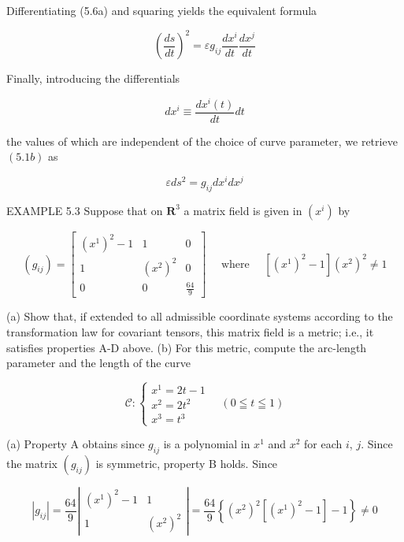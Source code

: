 \documentclass[10pt]{article}
\begin{document}
Differentiating (5.6a) and squaring yields the equivalent formula


\begin{equation*}
\left(\frac{d s}{d t}\right)^{2}=\varepsilon g_{i j} \frac{d x^{i}}{d t} \frac{d x^{j}}{d t} \tag{5.6b}
\end{equation*}


Finally, introducing the differentials

$$
d x^{i} \equiv \frac{d x^{i}(t)}{d t} d t
$$

the values of which are independent of the choice of curve parameter, we retrieve $(5.1 b)$ as


\begin{equation*}
\varepsilon d s^{2}=g_{i j} d x^{i} d x^{j} \tag{5.6c}
\end{equation*}


EXAMPLE 5.3 Suppose that on $\mathbf{R}^{3}$ a matrix field is given in $\left(x^{i}\right)$ by

$$
\left(g_{i j}\right)=\left[\begin{array}{ccc}
\left(x^{1}\right)^{2}-1 & 1 & 0 \\
1 & \left(x^{2}\right)^{2} & 0 \\
0 & 0 & \frac{64}{9}
\end{array}\right] \quad \text { where } \quad\left[\left(x^{1}\right)^{2}-1\right]\left(x^{2}\right)^{2} \neq 1
$$

(a) Show that, if extended to all admissible coordinate systems according to the transformation law for covariant tensors, this matrix field is a metric; i.e., it satisfies properties A-D above. (b) For this metric, compute the arc-length parameter and the length of the curve

$$
\mathscr{C}:\left\{\begin{array}{l}
x^{1}=2 t-1 \\
x^{2}=2 t^{2} \\
x^{3}=t^{3}
\end{array} \quad(0 \leqq t \leqq 1)\right.
$$

(a) Property A obtains since $g_{i j}$ is a polynomial in $x^{1}$ and $x^{2}$ for each $i$, $j$. Since the matrix $\left(g_{i j}\right)$ is symmetric, property B holds. Since

$$
\left|g_{i j}\right|=\frac{64}{9}\left|\begin{array}{cc}
\left(x^{1}\right)^{2}-1 & 1 \\
1 & \left(x^{2}\right)^{2}
\end{array}\right|=\frac{64}{9}\left\{\left(x^{2}\right)^{2}\left[\left(x^{1}\right)^{2}-1\right]-1\right\} \neq 0
$$
\end{document}
